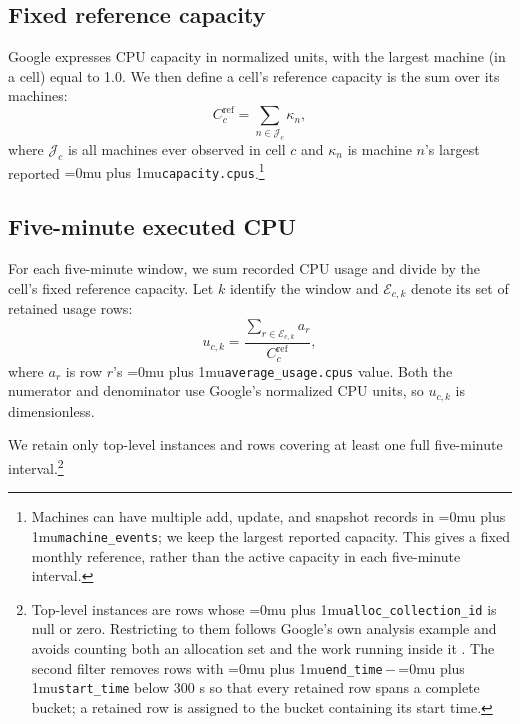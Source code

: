 \documentclass[conference]{IEEEtran}
\newcommand{\codepath}[1]{{\Urlmuskip=0mu plus 1mu\relax\nolinkurl{#1}}}
\begin{document}
\subsection{Fixed reference capacity}
\label{subsec:clusterdata-capacity}

Google expresses CPU capacity in normalized units, with the largest machine (in a cell)
equal to 1.0. We then define a cell's reference capacity is the sum over its machines:
\begin{equation}
  C^{\mathrm{ref}}_c
  =
  \sum_{n\in\mathcal{J}_c}\kappa_n ,
  \label{eq:reference-capacity}
\end{equation}
where \(\mathcal{J}_c\) is all machines ever observed in cell \(c\)
and \(\kappa_n\) is machine \(n\)'s largest reported
\codepath{capacity.cpus}.\footnote{Machines can have multiple add, update,
and snapshot records in \codepath{machine_events}; we keep the largest
reported capacity. This gives a fixed monthly reference, rather than the
active capacity in each five-minute interval.}

\subsection{Five-minute executed CPU}
\label{subsec:clusterdata-utilization}

For each five-minute window, we sum recorded CPU usage and divide by the
cell's fixed reference capacity. Let \(k\) identify the window and
\(\mathcal{E}_{c,k}\) denote its set of retained usage rows:
\begin{equation}
  u_{c,k}
  =
  \frac{\displaystyle\sum_{r\in\mathcal{E}_{c,k}} a_r}
         {C^{\mathrm{ref}}_c} ,
  \label{eq:clusterdata-utilization}
\end{equation}
where \(a_r\) is row \(r\)'s \codepath{average_usage.cpus} value. Both the
numerator and denominator use Google's normalized CPU units, so
\(u_{c,k}\) is dimensionless.

We retain only top-level instances and rows covering at least one full five-minute
interval.\footnote{Top-level instances are rows whose
\codepath{alloc_collection_id} is null or zero. Restricting to them follows
Google's own analysis example and avoids counting both an allocation set and
the work running inside it \cite{googleTraceFormatV3,
googleClusterAnalysisColab}. The second filter removes rows with
\codepath{end_time}\,\(-\)\,\codepath{start_time} below 300 s so that every
retained row spans a complete bucket; a retained row is assigned to the
bucket containing its start time.}
\end{document}
